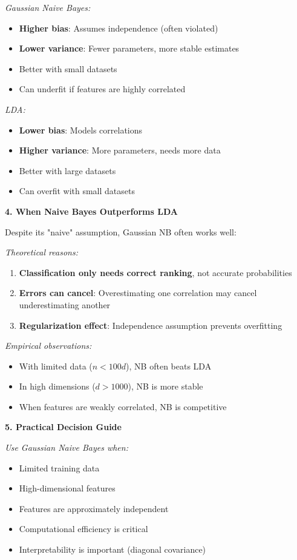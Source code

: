\documentclass[12pt]{article}
\begin{document}
\begin{explanation}
\textit{Gaussian Naive Bayes:}
\begin{itemize}
    \item \textbf{Higher bias}: Assumes independence (often violated)
    \item \textbf{Lower variance}: Fewer parameters, more stable estimates
    \item Better with small datasets
    \item Can underfit if features are highly correlated
\end{itemize}

\textit{LDA:}
\begin{itemize}
    \item \textbf{Lower bias}: Models correlations
    \item \textbf{Higher variance}: More parameters, needs more data
    \item Better with large datasets
    \item Can overfit with small datasets
\end{itemize}

\textbf{4. When Naive Bayes Outperforms LDA}

Despite its "naive" assumption, Gaussian NB often works well:

\textit{Theoretical reasons:}
\begin{enumerate}
    \item \textbf{Classification only needs correct ranking}, not accurate probabilities
    \item \textbf{Errors can cancel}: Overestimating one correlation may cancel underestimating another
    \item \textbf{Regularization effect}: Independence assumption prevents overfitting
\end{enumerate}

\textit{Empirical observations:}
\begin{itemize}
    \item With limited data ($n < 100d$), NB often beats LDA
    \item In high dimensions ($d > 1000$), NB is more stable
    \item When features are weakly correlated, NB is competitive
\end{itemize}

\textbf{5. Practical Decision Guide}

\textit{Use Gaussian Naive Bayes when:}
\begin{itemize}
    \item Limited training data
    \item High-dimensional features
    \item Features are approximately independent
    \item Computational efficiency is critical
    \item Interpretability is important (diagonal covariance)
\end{itemize}


\end{explanation}
\end{document}
